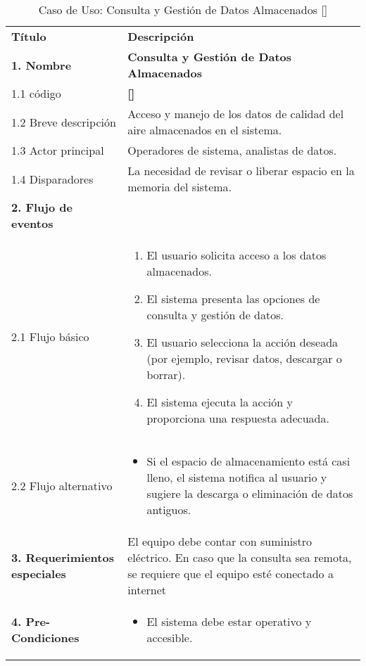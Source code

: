 \documentclass[
11pt, %
codirector, %
]{charter}
\makeatletter
\newcommand{\mytwodigits}[1]{\two@digits{#1}}
\newcounter{reqCounter}
\makeatother
\begin{document}


\begin{table}[h!]
	\caption{Caso de Uso: Consulta y Gestión de Datos Almacenados [\CODrequerimiento\mytwodigits{\value{reqCounter}}]}
	\centering
	\begin{tabular}{ | m{4.1cm} | m{10cm} | }
		\hline
		\rowcolor{gray!50} %
		\textbf{Título} & \textbf{Descripción} \\ %
		\textbf{1. Nombre} & \textbf{Consulta y Gestión de Datos Almacenados} \\
		1.1 código &\textbf{[\CODrequerimiento\mytwodigits{\value{reqCounter}}]} \\
		1.2 Breve descripción & Acceso y manejo de los datos de calidad del aire almacenados en el sistema. \\
		1.3 Actor principal & Operadores de sistema, analistas de datos. \\
		1.4 Disparadores & La necesidad de revisar o liberar espacio en la memoria del sistema. \\ \hline
		\textbf{2. Flujo de eventos} &  \\
		2.1 Flujo básico & 
		\begin{enumerate}
			\item El usuario solicita acceso a los datos almacenados.
			\item El sistema presenta las opciones de consulta y gestión de datos.
			\item El usuario selecciona la acción deseada (por ejemplo, revisar datos, descargar o borrar).
			\item El sistema ejecuta la acción y proporciona una respuesta adecuada.
		\end{enumerate} \\
		2.2 Flujo alternativo & 
		\begin{itemize}
			\item Si el espacio de almacenamiento está casi lleno, el sistema notifica al usuario y sugiere la descarga o eliminación de datos antiguos.
		\end{itemize} \\ \hline
		\textbf{3. Requerimientos especiales} & El equipo debe contar con suministro eléctrico. En caso que la consulta sea remota, se requiere que el equipo esté conectado a internet \\ \hline
		\textbf{4. Pre-Condiciones} & 
		\begin{itemize}
			\item El sistema debe estar operativo y accesible.

\end{itemize}
\end{tabular}
\end{table}
\end{document}
